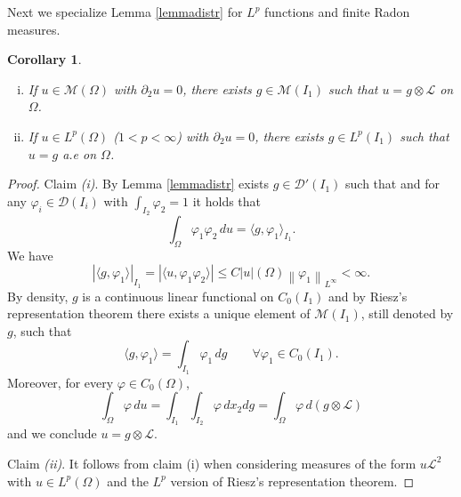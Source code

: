 \documentclass[a4, 11pt, reqno, final]{amsart}
\newcommand{\calD}{\mathcal{D}}
\newcommand{\calL}{\mathcal{L}}
\newcommand{\calM}{\mathcal{M}}
\newcommand{\n}[1]{\left\|#1\right\|}  %
\theoremstyle{plain}%
\newtheorem{corollary}[theorem]{Corollary}
\newcommand{\QED}{\hspace{1ex}\hfill$\blacksquare$\vspace{2ex}}
\begin{document}
	Next we specialize	Lemma \ref{lemmadistr} for $L^p$ functions and finite Radon measures.
	\begin{corollary}\label{corLp}
		\begin{enumerate}[(i)]
			\item If $u \in \calM(\Omega)$ with $\partial_2 u = 0$, there exists $g \in \calM(I_1)$ such that $u = g \otimes \calL$ on $\Omega$.
			\item If $u \in L^p(\Omega)$ ($1<p<\infty$) with $\partial_2 u = 0$, there exists $g \in L^p(I_1)$ such that $u = g$ a.e on $\Omega$.
		\end{enumerate}
	\end{corollary}
	\begin{proof}
		Claim	\textit{(i)}. By Lemma \ref{lemmadistr} exists $g \in \calD'(I_1)$ such that
		and for any $\varphi_i \in \calD(I_i)$ with $\int_{I_2} \varphi_2 = 1$ it holds that
		$$ \int_{\Omega} \varphi_1 \varphi_2 \, du = \langle g, \varphi_1 \rangle_{I_1}.$$
		We have
		$$ |\langle g, \varphi_1\rangle|_{I_1} = |\langle u, \varphi_1\varphi_2 \rangle| \leq C|u|(\Omega) \n{\varphi_1}_{L^\infty} <\infty. $$
		By density, $g$ is a continuous linear functional on $C_0(I_1)$ and by Riesz's  representation theorem there exists a unique element of $\calM(I_1)$, still denoted by $g$, such that
		$$ \langle g, \varphi_1\rangle = \int_{I_1} \varphi_1 \, dg \qquad \forall \varphi_1 \in C_0(I_1).$$
		Moreover, for every $\varphi \in C_0(\Omega)$,
		$$ \int_{\Omega}\varphi \, du = \int_{I_1} \int_{I_2}\varphi \, dx_2 dg  = \int_{\Omega} \varphi \, d(g \otimes \calL)$$
		and we conclude $u = g \otimes \calL$.

		Claim	\textit{(ii)}. It follows from claim (i) when considering measures of the form $u\calL^2$ with $u \in L^p(\Omega)$ and the $L^p$ version of Riesz's representation theorem.
	\end{proof}
\end{document}
